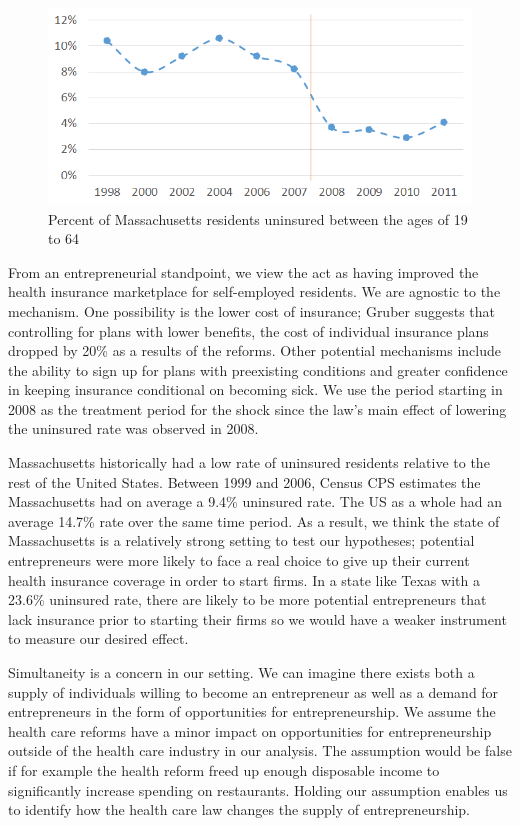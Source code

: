 \begin{figure}[h]
	\centering
	\includegraphics[scale=0.6]{resources/uninsured}
	\caption{Percent of Massachusetts residents uninsured between the ages of 19 to 64}
	\label{fig:uninsuredRate}
\end{figure}

From an entrepreneurial standpoint, we view the act as having improved the health insurance marketplace for self-employed residents. We are agnostic to the mechanism. One possibility is the lower cost of insurance; Gruber \cite{gruber_mass} suggests that controlling for plans with lower benefits, the cost of individual insurance plans dropped by 20\% as a results of the reforms. Other potential mechanisms include the ability to sign up for plans with preexisting conditions and greater confidence in keeping insurance conditional on becoming sick. We use the period starting in 2008 as the treatment period for the shock since the law's main effect of lowering the uninsured rate was observed in 2008. 

Massachusetts historically had a low rate of uninsured residents relative to the rest of the United States. Between 1999 and 2006, Census CPS estimates the Massachusetts had on average a 9.4\% uninsured rate. The US as a whole had an average 14.7\% rate over the same time period. As a result, we think the state of Massachusetts is a relatively strong setting to test our hypotheses; potential entrepreneurs were more likely to face a real choice to give up their current health insurance coverage in order to start firms. In a state like Texas with a 23.6\% uninsured rate, there are likely to be more potential entrepreneurs that lack insurance prior to starting their firms so we would have a weaker instrument to measure our desired effect. 

Simultaneity is a concern in our setting. We can imagine there exists both a supply of individuals willing to become an entrepreneur as well as a demand for entrepreneurs in the form of opportunities for entrepreneurship. We assume the health care reforms have a minor impact on opportunities for entrepreneurship outside of the health care industry in our analysis. The assumption would be false if for example the health reform freed up enough disposable income to significantly increase spending on restaurants. Holding our assumption enables us to identify how the health care law changes the supply of entrepreneurship. 

